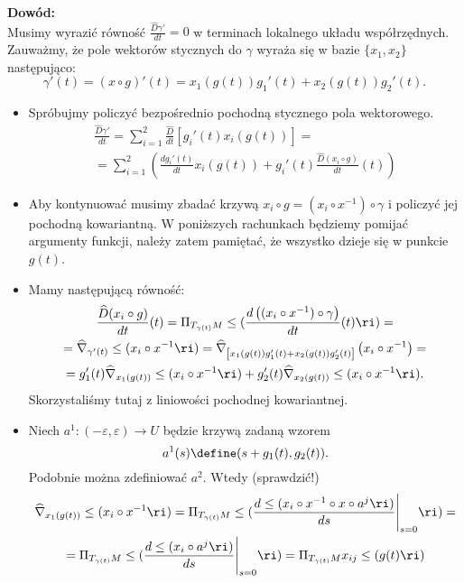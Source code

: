 \textcolor{ared}{\textbf{Dowód:}}\\
Musimy wyrazić równość $\frac{\widehat{D}\gamma'}{dt}=0$ w terminach lokalnego układu współrzędnych. 
Zauważmy, że pole wektorów stycznych do $\gamma$ wyraża się w bazie $\{x_1,x_2\}$ następująco:\[\gamma'(t)=(x\circ g)'(t)=x_1(g(t))g_1'(t)+x_2(g(t))g_2'(t).\]
\begin{itemize}
\item Spróbujmy policzyć bezpośrednio pochodną stycznego pola wektorowego.
\begin{multline}\label{eqn:loc-geod}
\frac{\widehat{D}\gamma'}{dt}=\sum_{i=1}^2 \frac{\widehat{D}}{dt}\left[g_i'(t) 
x_i(g(t))\right]=\\
=\sum_{i=1}^2\left(\frac{d g_i'(t)}{dt}x_i(g(t))+g_i'(t)\frac{\widehat{D}(x_{i}\circ g)}{dt}(t)\right)
\end{multline}

\item Aby kontynuować musimy zbadać krzywą $x_i\circ g=(x_i\circ x^{-1})\circ \gamma$ i policzyć jej pochodną
kowariantną. W poniższych rachunkach będziemy pomijać argumenty funkcji, należy zatem pamiętać, że wszystko dzieje się w punkcie $g(t)$.

\item Mamy następującą równość:
\begin{multline*}
\frac{\widehat{D}(x_i\circ g)}{dt}(t)=
\Pi_{T_{\gamma(t)}M}\le(\frac{d\left((x_i\circ x^{-1})\circ 
\gamma\right)}{dt}(t)\ri)=\\ =\widehat{\nabla}_{\gamma'(t)}\le(x_i\circ 
x^{-1}\ri)=\widehat{\nabla}_{\left[x_1(g(t))g_1'(t)+x_2(g(t))g_2'(t)\right]}
\left(x_i \circ x^{-1} \right)=\\
=g_1'(t)\widehat{\nabla}_{x_1(g(t))}\le(x_i\circ x^{-1}\ri)+g_2'(t)\widehat{\nabla}_{x_2(g(t))}\le(x_i\circ x^{-1}\ri).
\end{multline*}
Skorzystaliśmy tutaj z liniowości pochodnej kowariantnej. 

\item Niech $a^{1}\colon (-\varepsilon,\varepsilon)\to U$ będzie krzywą zadaną wzorem
\[a^{1}(s)\define(s+g_1(t),g_2(t)).\] Podobnie można zdefiniować $a^{2}$. Wtedy 
(sprawdzić!)
\begin{multline*}
\widehat{\nabla}_{x_1(g(t))}\le(x_i\circ x^{-1}\ri)=\Pi_{T_{\gamma(t)}M}\le(\frac{d\le( x_i\circ x^{-1}\circ x\circ a^{j}\ri)}{ds}\Bigg|_{s=0}\ri)=\\
=\Pi_{T_{\gamma(t)}M}\le(\frac{d\le(x_i\circ a^{j}\ri)}{ds}\Bigg|_{s=0}\ri)=\Pi_{T_{\gamma(t)}M}x_{ij}\le(g(t)\ri)
\end{multline*}


\end{itemize}
